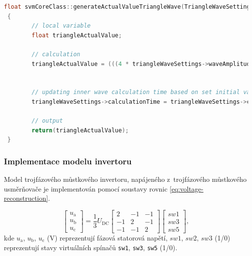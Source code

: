 \documentclass[a4paper, twoside, 11pt]{article}
\begin{document}
			  \begin{lstlisting}[language={c++}, caption={Implementace výpočtu aktuální hodnoty pilovitého průběhu.}, label={lst:implementace-vypoctu-triangle-actual-value}]
float svmCoreClass::generateActualValueTriangleWave(TriangleWaveSettingsType *triangleWaveSettings)
 {
        // local variable
        float triangleActualValue;

        // calculation
        triangleActualValue = (((4 * triangleWaveSettings->waveAmplitude)/triangleWaveSettings->wavePeriod) * abs(fmod((fmod((triangleWaveSettings->calculationTime-(triangleWaveSettings->wavePeriod/4)), triangleWaveSettings->wavePeriod) +  triangleWaveSettings->wavePeriod),  triangleWaveSettings->wavePeriod) - ( triangleWaveSettings->wavePeriod/2)) - triangleWaveSettings->waveAmplitude);


        // updating inner wave calculation time based on set initial value of calculationTime
        triangleWaveSettings->calculationTime = triangleWaveSettings->calculationTime + triangleWaveSettings->calculationStep;

        // output
        return(triangleActualValue);
 }\end{lstlisting}

		\subsubsection{Implementace modelu invertoru}
			Model trojfázového můstkového invertoru, napájeného z~trojfázového můstkového usměrňovače je implementován pomocí soustavy rovnic \ref{eq:voltage-reconstruction}. \cite{lipcak-bauer-ept-moodle}

			\begin{equation}
				\begin{bmatrix}
					u_\text{a}\\
					u_\text{b}\\
					u_\text{c}
				\end{bmatrix}
				=
				\frac{1}{3} U_\text{DC}
				\begin{bmatrix}
					2 & -1 & -1\\
					-1 & 2 & -1\\
					-1 & -1 & 2
				\end{bmatrix}
				\begin{bmatrix}
					sw1\\
					sw3\\
					sw5
				\end{bmatrix},
				\label{eq:voltage-reconstruction}
			\end{equation}
			kde $u_\text{a}$, $u_\text{b}$, $u_\text{c}$ (V) reprezentují fázová statorová napětí, $sw1$, $sw2$, $sw3$ (1/0) reprezentují stavy virtuálních spínačů \texttt{sw1}, \texttt{sw3}, \texttt{sw5} (1/0).
\end{document}

